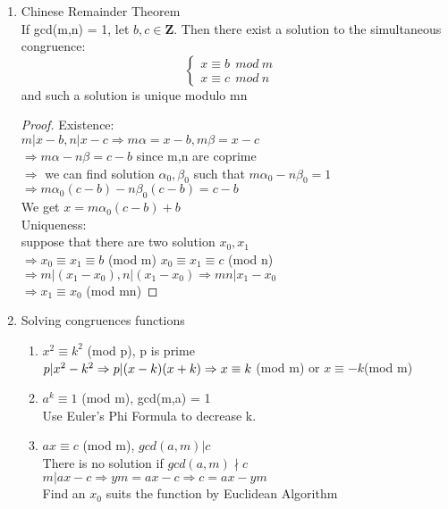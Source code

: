\documentclass[10pt]{article}
\newcommand{\Zb}{\mathbf{Z}}
\begin{document}
\begin{multicols}{2}
\begin{enumerate}
	\item Chinese Remainder Theorem\\
	If gcd(m,n) = 1, let $b,c \in \Zb$. Then there exist a solution to the simultaneous congruence:
	\begin{equation}
	\left\{
		\begin{array}{lr}
		x \equiv b \ \ mod \ m &\\
		x \equiv c \ \ mod \ n
		\end{array}
	\right.
	\end{equation}
	and such a solution is unique modulo mn
	\begin{proof}
		Existence:\\
		$m|x-b, n|x-c\Rightarrow m\alpha = x-b, m\beta = x - c$\\
		$\Rightarrow m\alpha - n\beta = c-b$ since m,n are coprime\\
		$\Rightarrow$ we can find solution $\alpha_0, \beta_0$ such that $m\alpha_0-n\beta_0 = 1$\\
		$\Rightarrow m\alpha_0(c-b) -n\beta_0(c-b) = c-b$\\ We get $x = m\alpha_0(c-b)+b$\\
		Uniqueness:\\
		suppose that there are two solution $x_0, x_1$\\
		$\Rightarrow x_0 \equiv x_1 \equiv b$ (mod m) $x_0 \equiv x_1 \equiv c$ (mod n)\\
		$\Rightarrow m|(x_1 - x_0), n | (x_1 - x_0) \Rightarrow mn|x_1-x_0$\\
		$\Rightarrow x_1 \equiv x_0$ (mod mn)
	\end{proof}
	\item Solving congruences functions
	\begin{enumerate}
		\item $x^2 \equiv k^2$ (mod p), p is prime\\
		$p|x^2 - k^2 \Rightarrow p|(x-k)(x+k) \\ \Rightarrow x\equiv k$ (mod m) or $x\equiv -k$(mod m)
		\item $a^k \equiv 1$ (mod m), gcd(m,a) = 1\\
		Use Euler's Phi Formula to decrease k.
		\item $ax\equiv c$ (mod m), $gcd(a,m)|c$\\
		There is no solution if $gcd(a,m) \nmid c$\\
		$m|ax - c \Rightarrow ym = ax - c \Rightarrow c = ax - ym$\\
		Find an $x_0$ suits the function by Euclidean Algorithm\\

\end{enumerate}
\end{enumerate}
\end{multicols}
\end{document}
